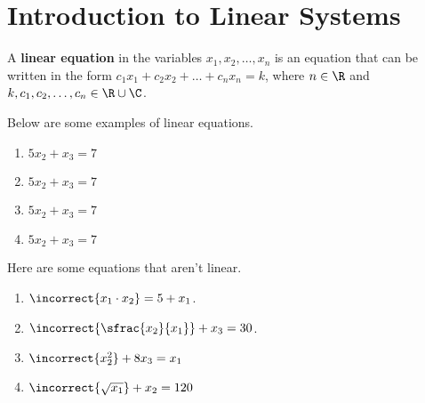 
\section{Introduction to Linear Systems}
\label{sec:introduction_to_linear_systems}

\begin{definition}
  \label{def:linear_equation}

  A \textbf{linear equation} in the variables $x_1, x_2, \dots, x_n$ is an
  equation that can be written in the form $c_1x_1 + c_2x_2 + \dots + c_nx_n =
  k$, where $n \in \R$ and $k, c_1, c_2, \dots, c_n \in \R \cup \C$.
\end{definition}

\begin{example}
  \label{exm:linear_equation}

  Below are some examples of linear equations.

  \begin{multicols}{2}\noindent
    \begin{enumerate}
      \label{enum:linear_equation_1}

      \item $5x_2 + x_3 = 7$
      \item $5x_2 + x_3 = 7$
      \columnbreak
      \item $5x_2 + x_3 = 7$
      \item $5x_2 + x_3 = 7$
    \end{enumerate}
  \end{multicols}

  Here are some equations that aren't linear.

  \begin{multicols}{2}\noindent
    \begin{enumerate}
      \label{enum:non_linear_equation_1}

      \item $\incorrect{x_1 \cdot x_2} = 5 + x_1$.
      \item $\incorrect{\sfrac{x_2}{x_1}} + x_3 = 30$.

      \item $\incorrect{x_2^2} + 8x_3 = x_1$
      \item $\incorrect{\sqrt{x_1}} + x_2 = 120$
    \end{enumerate}
  \end{multicols}
\end{example}

